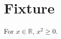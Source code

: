 \documentclass{article}
\begin{document}
\section{Fixture}
\begin{apotheorem}For $x \in \mathbb{R}$, $x^2 \geq 0$.\end{apotheorem}
\politologo\quad\unifilogo
\end{document}
